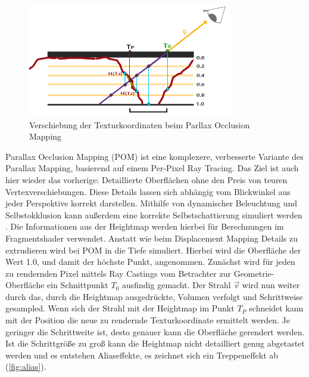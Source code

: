 \begin{figure}[h]
	\centering
	\includegraphics[width=0.8\textwidth]{Grafiken/Basics/Mapping/Infografik_POM.png}
	\begin{footnotesize}
		\caption{Verschiebung der Texturkoordinaten beim Parllax Occlusion Mapping}
	\end{footnotesize}
\end{figure}


Parallax Occlusion Mapping (POM) ist eine komplexere, verbesserte Variante des Parallax Mapping, basierend auf einem Per-Pixel Ray Tracing.
Das Ziel ist auch hier wieder das vorherige: Detaillierte Oberflächen ohne den Preis von teuren Vertexverschiebungen.
Diese Details lassen sich abhängig vom Blickwinkel aus jeder Perspektive korrekt darstellen.
Mithilfe von dynamischer Beleuchtung und Selbstokklusion kann außerdem eine korrekte Selbstschattierung simuliert werden \parencite{Brawley2004, Tatarchuk2006}.
Die Informationen aus der Heightmap werden hierbei für Berechnungen im Fragmentshader verwendet.
Anstatt wie beim Displacement Mapping Details zu extrudieren wird bei POM in die Tiefe simuliert.
Hierbei wird die Oberfläche der Wert 1.0, und damit der höchste Punkt, angenommen.
Zunächst wird für jeden zu rendernden Pixel mittels Ray Castings vom Betrachter zur Geometrie-Oberfläche ein Schnittpunkt  $T_0$ ausfindig gemacht.
Der Strahl $\vec{v}$ wird nun weiter durch das, durch die Heightmap ausgedrückte, Volumen verfolgt und Schrittweise gesampled. Wenn sich der Strahl 
mit der Heightmap im Punkt $T_P$ schneidet
kann mit der Position die neue zu rendernde Texturkoordinate ermittelt werden. Je geringer die Schrittweite ist, desto genauer kann die Oberfläche gerendert werden.
Ist die Schrittgröße zu groß kann die Heightmap nicht detailliert genug abgetastet werden und es entstehen Aliaseffekte, es zeichnet sich
ein Treppeneffekt ab
(\autoref{fig:alias}).


